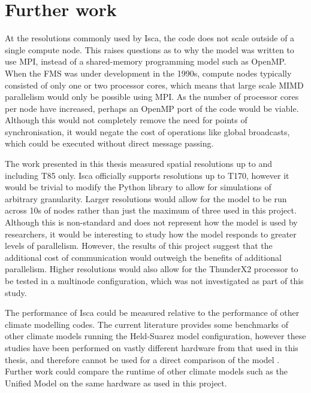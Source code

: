 \documentclass[a4paper,11pt]{report}
\begin{document}
\section{Further work}
At the resolutions commonly used by Isca, the code does not scale outside of a single compute node. This raises questions as to why the model was written to use MPI, instead of a shared-memory programming model such as OpenMP. When the FMS was under development in the 1990s, compute nodes typically consisted of only one or two processor cores, which means that large scale MIMD parallelism would only be possible using MPI. As the number of processor cores per node have increased, perhaps an OpenMP port of the code would be viable. Although this would not completely remove the need for points of synchronisation, it would negate the cost of operations like global broadcasts, which could be executed without direct message passing. 
\par
The work presented in this thesis measured spatial resolutions up to and including T85 only. Isca officially supports resolutions up to T170, however it would be trivial to modify the Python library to allow for simulations of arbitrary granularity. Larger resolutions would allow for the model to be run across 10s of nodes rather than just the maximum of three used in this project. Although this is non-standard and does not represent how the model is used by researchers, it would be interesting to study how the model responds to greater levels of parallelism. However, the results of this project suggest that the additional cost of communication would outweigh the benefits of additional parallelism. Higher resolutions would also allow for the ThunderX2 processor to be tested in a multinode configuration, which was not investigated as part of this study. 
\par
The performance of Isca could be measured relative to the performance of other climate modelling codes. The current literature provides some benchmarks of other climate models running the Held-Suarez model configuration, however these studies have been performed on vastly different hardware from that used in this thesis, and therefore cannot be used for a direct comparison of the model \cite{schmidt2007benchmark}. Further work could compare the runtime of other climate models such as the Unified Model on the same hardware as used in this project.
\par
\end{document}
